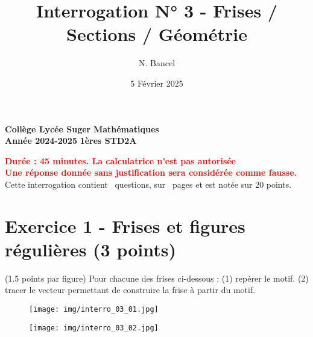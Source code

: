 \documentclass[answers]{exam}
\title{Interrogation N° 3 - Frises / Sections / Géométrie}
\author{N. Bancel}
\date{5 Février 2025}
\begin{document}
\textbf{Collège Lycée Suger}
\hfill
\textbf{Mathématiques} \\

\textbf{Année 2024-2025}
\hfill
\textbf{1ères STD2A} \par

{\let\newpage\relax\maketitle}

  
  {\let\newpage\relax\maketitle}

  \begin{center}
  \textbf{\textcolor{red}{Durée : 45 minutes. La calculatrice n'est pas autorisée}} \\
  \textbf{\textcolor{red}{Une réponse donnée sans justification sera considérée comme fausse.}} \\
  Cette interrogation contient \numquestions\ questions, sur \numpages\ pages et est notée sur 20 points. 
  
  \end{center}

\section*{Exercice 1 - Frises et figures régulières (3 points)}

\begin{questions}
\question[3] (1.5 points par figure) Pour chacune des frises ci-dessous : (1) repérer le motif. (2) tracer le vecteur permettant de construire la frise à partir du motif.
\begin{figure}[H]
  \centering
  \texttt{[image: img/interro\_03\_01.jpg]}
\end{figure}
\begin{figure}[H]
  \centering
  \texttt{[image: img/interro\_03\_02.jpg]}
\end{figure}
\end{questions}
\end{document}
